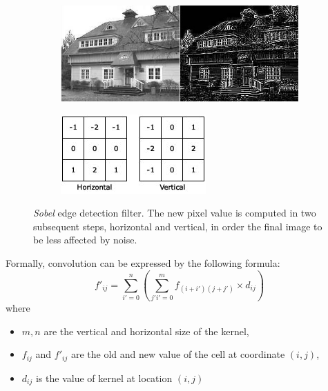\begin{figure}[!htb]
    \begin{subfigure}{1.0\textwidth}
        \includegraphics[width=\linewidth]{./images/opencal/sobel_example}
    \end{subfigure}
    
    \endminipage\hfill
    \begin{subfigure}{1.0\textwidth}
        \includegraphics[width=\linewidth]{./images/opencal/conv-sobel}    
    \end{subfigure}
    \endminipage\hfill
    \caption[\textit{Sobel} edge detection filter]{\textit{Sobel} edge detection filter. The new pixel value is computed in two subsequent steps, horizontal and vertical, in order the final image to be less affected by noise.}
    \label{fig:sobel}
\end{figure}

Formally, convolution can be expressed by the following formula:
\begin{equation}
   f'_{ij} = \sum_{i'=0}^n (\sum_{j'i'=0}^m f_{(i+i')(j+j')}\times d_{ij})
   \label{eq:convolution}
\end{equation}
where 
\begin{itemize}
    \item $m,n$ are the  vertical and horizontal size of the kernel,
    \item $f_{ij}$ and $f'_{ij}$ are the old and new value of the cell at coordinate $(i,j)$,
    \item $d_{ij}$ is the value of kernel at location $(i,j)$ 
\end{itemize}

